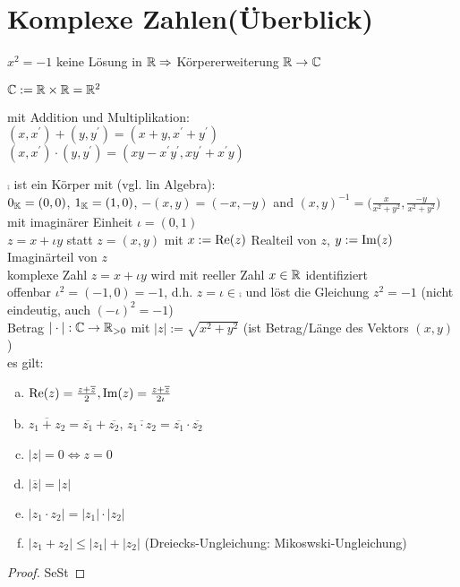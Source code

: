 \chapter{Komplexe Zahlen(Überblick)}
\begin{description}
	\item[Problem:] $x^2 = -1$ keine Lösung in $\mathbb{R} \Rightarrow$ Körpererweiterung $\mathbb{R} \to \mathbb{C}$
	\item[Betrachte Menge der komplexen Zahlen] $\mathbb{C} := \mathbb{R} \times \mathbb{R} = \mathbb{R}^2$
	\item mit Addition und Multiplikation:\\
	$(x,x^{'}) + (y,y^{'}) = (x+y, x^{'} + y^{'})$\\
	$(x,x^{'}) \cdot (y,y^{'}) = (xy - x^{'}y^{'}, xy^{'}+x^{'}y)$
	\item $\comp$ ist ein Körper mit (vgl. lin Algebra):\\
	$0_{\mathbb{K}} = (0,0)$,  $1_{\mathbb{K}} = (1,0)$, $-(x,y) = (-x,-y)$ and $(x,y)^{-1} = \bigg(\frac{x}{x^2+y^2},\frac{-y}{x^2+y^2}\bigg)$\\
	mit imaginärer Einheit $\iota=(0,1)$\\
	$z=x+\iota y$ statt $z=(x,y)$ mit $x:=\operatorname{Re}(z)$ Realteil von $z$, $y:= \operatorname{Im}(z)$ Imaginärteil von $z$\\
	komplexe Zahl $z=x + \iota y$ wird mit reeller Zahl $x \in \mathbb{R}$ identifiziert\\
	offenbar $\iota^2=(-1,0)=-1$, d.h. $z=\iota \in \comp$ und löst die Gleichung $z^2=-1$ (nicht eindeutig, auch $(-\iota)^2 = -1$)\\
	Betrag $|\cdot|: \mathbb{C} \to \mathbb{R}_{> 0}$ mit $|z|:= \sqrt{x^2+y^2}$ (ist Betrag/Länge des Vektors $(x,y)$)\\
	es gilt:
	\begin{enumerate}[a)]
		\item $\operatorname{Re}(z) = \frac{z+\overline{z}}{2}, \operatorname{Im}(z) = \frac{z+\overline{z}}{2\iota}$
		\item $\overline{z_1 + z_2} = \overline{z_1} + \overline{z_2}$, $\overline{z_1 \cdot z_2} = \overline{z_1} \cdot \overline{z_2}$
		\item $|z| = 0 \iff z=0$
		\item $|\overline{z}| = |z|$
		\item $|z_1 \cdot z_2| = |z_1| \cdot |z_2|$
		\item $|z_1 + z_2| \leq |z_1| + |z_2|$ (Dreiecks-Ungleichung: Mikoswski-Ungleichung)
	\end{enumerate}
\begin{proof}
	SeSt \QEDA
\end{proof}
\end{description}
